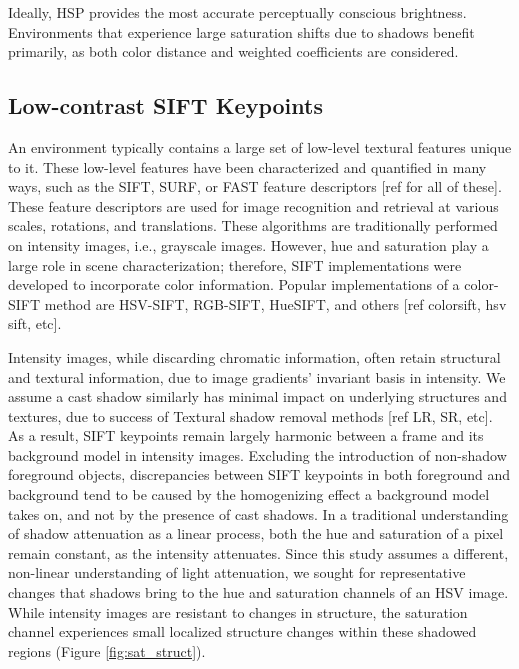 \documentclass[12pt]{report}
\begin{document}
Ideally, HSP provides the most accurate perceptually conscious brightness. Environments that experience large saturation shifts due to shadows benefit primarily, as both color distance and weighted coefficients are considered.

\subsection{Low-contrast SIFT Keypoints} \label{section:lowcSIFT}

An environment typically contains a large set of low-level textural features unique to it. These low-level features have been characterized and quantified in many ways, such as the SIFT, SURF, or FAST feature descriptors [ref for all of these]. These feature descriptors are used for image recognition and retrieval at various scales, rotations, and translations. These algorithms are traditionally performed on intensity images, i.e., grayscale images. However, hue and saturation play a large role in scene characterization; therefore, SIFT implementations were developed to incorporate color information. Popular implementations of a color-SIFT method are HSV-SIFT, RGB-SIFT, HueSIFT, and others [ref colorsift, hsv sift, etc].

Intensity images, while discarding chromatic information, often retain structural and textural information, due to image gradients' invariant basis in intensity. We assume a cast shadow similarly has minimal impact on underlying structures and textures, due to success of Textural shadow removal methods [ref LR, SR, etc]. As a result, SIFT keypoints remain largely harmonic between a frame and its background model in intensity images. Excluding the introduction of non-shadow foreground objects, discrepancies between SIFT keypoints in both foreground and background tend to be caused by the homogenizing effect a background model takes on, and not by the presence of cast shadows. In a traditional understanding of shadow attenuation as a linear process, both the hue and saturation of a pixel remain constant, as the intensity attenuates. Since this study assumes a different, non-linear understanding of light attenuation, we sought for representative changes that shadows bring to the hue and saturation channels of an HSV image. While intensity images are resistant to changes in structure, the saturation channel experiences small localized structure changes within these shadowed regions (Figure \ref{fig:sat_struct}).
\end{document}
